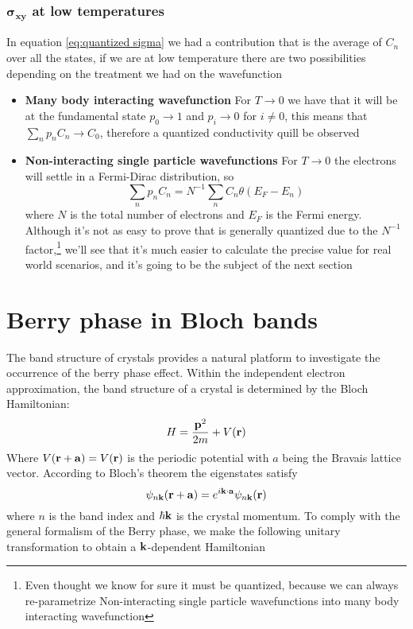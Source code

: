 \subsubsection*{$\boldsymbol{\sigma_{xy}}$ at low temperatures}
In equation \ref{eq:quantized sigma} we had a contribution that is the average of $C_n$ over all the states, if we are at low temperature there are two possibilities depending on the treatment we had on the wavefunction
\begin{itemize}
    \item \textbf{Many body interacting wavefunction} For $T\to 0$ we have that it will be at the fundamental state $p_0\to1$ and $p_i\to 0$ for $i\neq 0$, this means that $\sum_np_nC_n\to C_0$, therefore a quantized conductivity quill be observed
    \item \textbf{Non-interacting single particle wavefunctions} For $T\to 0$ the electrons will settle in a Fermi-Dirac distribution, so \[\sum_np_nC_n=N^{-1}\sum_nC_n\theta(E_F-E_n)\] where $N$ is the total number of electrons and $E_F$ is the Fermi energy. Although it's not as easy to prove that is generally quantized due to the $N^{-1}$ factor,\footnote{Even thought we know for sure it must be quantized, because we can always re-parametrize Non-interacting single particle wavefunctions into many body interacting wavefunction} we'll see that it's much easier to calculate the precise value for real world scenarios, and it's going to be the subject of the next section
\end{itemize}



















\section{Berry phase in Bloch bands}
The band structure of crystals provides a natural platform to investigate the occurrence of the berry phase effect. Within the independent electron approximation, the band structure of a crystal is determined by the Bloch Hamiltonian:
\begin{equation}
    H= \frac {\mathbf{p}^2}{2m} + V(\mathbf{r})
\end{equation}
Where $V(\mathbf{r}+\mathbf{a})=V(\mathbf{r})$ is the periodic potential with $a$ being the Bravais lattice vector. According to Bloch's theorem the eigenstates satisfy 
\begin{equation}
    \psi_{n\mathbf{k}}(\mathbf{r}+\mathbf{a})=e^{i\mathbf{k}\cdot \mathbf{a}}\psi_{n\mathbf{k}}(\mathbf{r})
\end{equation}
where $n$ is the band index and $\hbar \mathbf{k}$ is the crystal momentum. To comply with the general formalism of the Berry phase, we make the following unitary transformation to obtain a $\mathbf{k}$-dependent Hamiltonian

